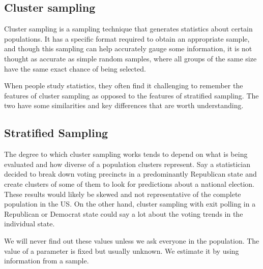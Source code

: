 ﻿\documentclass[]{report}
\begin{document}

\subsection{Cluster sampling }
Cluster sampling is a sampling technique that generates statistics about certain populations. It has a specific format required to obtain an appropriate sample, and though this sampling can help accurately gauge some information, it is not thought as accurate as simple random samples, where all groups of the same size have the same exact chance of being selected. 


When people study statistics, they often find it challenging to remember the features of cluster sampling as opposed to the features of stratified sampling. The two have some similarities and key differences that are worth understanding.


\subsection{Stratified Sampling}
The degree to which cluster sampling works tends to depend on what is being evaluated and how diverse of a population clusters represent. Say a statistician decided to break down voting precincts in a predominantly Republican state and create clusters of some of them to look for predictions about a national election. These results would likely be skewed and not representative of the complete population in the US. On the other hand, cluster sampling with exit polling in a Republican or Democrat state could say a lot about the voting trends in the individual state.




We will never find out these values unless we ask everyone in the population. The value of a parameter is fixed but usually unknown. We estimate it by using information from a sample. 
\end{document}
